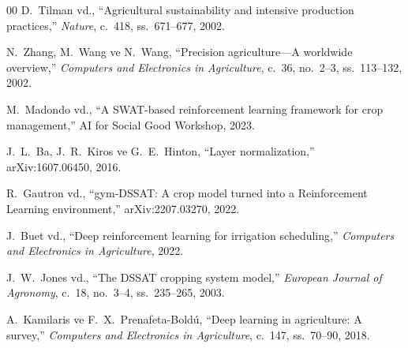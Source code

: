 \documentclass[10pt,twocolumn,a4paper]{article}
\begin{document}
\begin{thebibliography}{00}
D.~Tilman vd., ``Agricultural sustainability and intensive production practices,'' \textit{Nature}, c.~418, ss.~671--677, 2002.

N.~Zhang, M.~Wang ve N.~Wang, ``Precision agriculture---A worldwide overview,'' \textit{Computers and Electronics in Agriculture}, c.~36, no.~2--3, ss.~113--132, 2002.

M.~Madondo vd., ``A SWAT-based reinforcement learning framework for crop management,'' AI for Social Good Workshop, 2023.

J.~L.~Ba, J.~R.~Kiros ve G.~E.~Hinton, ``Layer normalization,'' arXiv:1607.06450, 2016.

R.~Gautron vd., ``gym-DSSAT: A crop model turned into a Reinforcement Learning environment,'' arXiv:2207.03270, 2022.

J.~Buet vd., ``Deep reinforcement learning for irrigation scheduling,'' \textit{Computers and Electronics in Agriculture}, 2022.

J.~W.~Jones vd., ``The DSSAT cropping system model,'' \textit{European Journal of Agronomy}, c.~18, no.~3--4, ss.~235--265, 2003.

A.~Kamilaris ve F.~X.~Prenafeta-Boldú, ``Deep learning in agriculture: A survey,'' \textit{Computers and Electronics in Agriculture}, c.~147, ss.~70--90, 2018.
\end{thebibliography}
\end{document}

